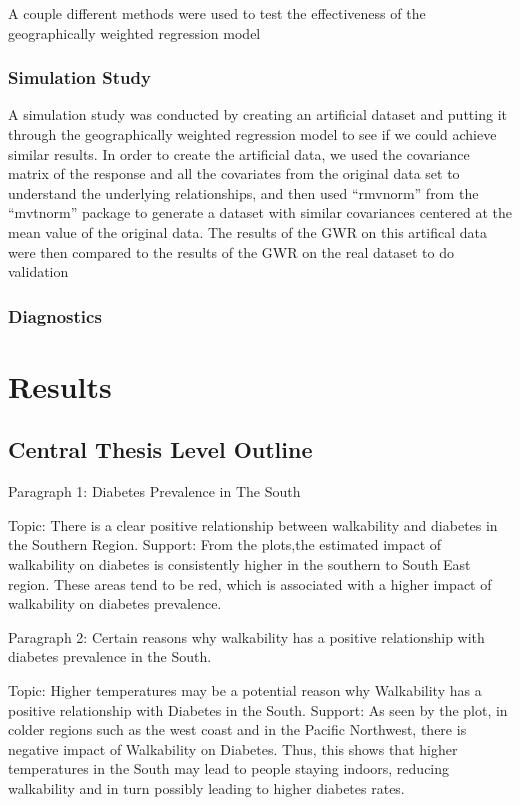 \documentclass[
]{article}
\begin{document}
A couple different methods were used to test the effectiveness of the
geographically weighted regression model

\subsubsection{Simulation Study}\label{simulation-study}

A simulation study was conducted by creating an artificial dataset and
putting it through the geographically weighted regression model to see
if we could achieve similar results. In order to create the artificial
data, we used the covariance matrix of the response and all the
covariates from the original data set to understand the underlying
relationships, and then used ``rmvnorm'' from the ``mvtnorm'' package to
generate a dataset with similar covariances centered at the mean value
of the original data. The results of the GWR on this artifical data were
then compared to the results of the GWR on the real dataset to do
validation

\subsubsection{Diagnostics}\label{diagnostics}

\section{Results}\label{results}

\subsection{Central Thesis Level
Outline}\label{central-thesis-level-outline}

Paragraph 1: Diabetes Prevalence in The South

Topic: There is a clear positive relationship between walkability and
diabetes in the Southern Region. Support: From the plots,the estimated
impact of walkability on diabetes is consistently higher in the southern
to South East region. These areas tend to be red, which is associated
with a higher impact of walkability on diabetes prevalence.

Paragraph 2: Certain reasons why walkability has a positive relationship
with diabetes prevalence in the South.

Topic: Higher temperatures may be a potential reason why Walkability has
a positive relationship with Diabetes in the South. Support: As seen by
the plot, in colder regions such as the west coast and in the Pacific
Northwest, there is negative impact of Walkability on Diabetes. Thus,
this shows that higher temperatures in the South may lead to people
staying indoors, reducing walkability and in turn possibly leading to
higher diabetes rates.
\end{document}
